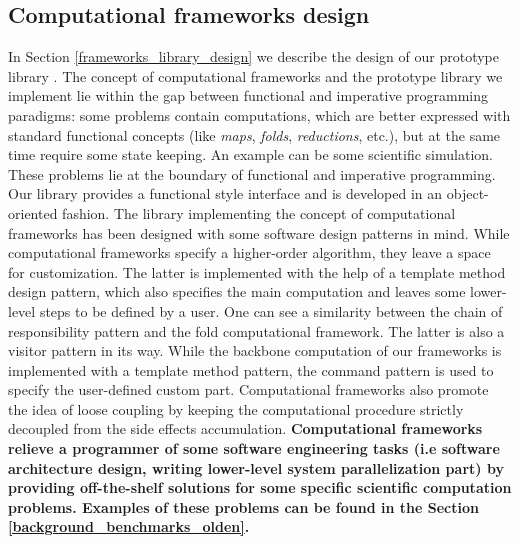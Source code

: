 \subsection{Computational frameworks design}
\label{background_frameworks_design}
\quad In Section \ref{frameworks_library_design} we describe the design of our prototype library \cite{frameworks-repo}. The concept of computational frameworks and the prototype library we implement lie within the gap between functional and imperative programming paradigms: some problems contain computations, which are better expressed with standard functional concepts (like \textit{maps}, \textit{folds}, \textit{reductions}, etc.), but at the same time require some state keeping. An example can be some scientific simulation. These problems lie at the boundary of functional and imperative programming. Our library provides a functional style interface and is developed in an object-oriented fashion.\newline\null
\quad The library implementing the concept of computational frameworks has been designed with some software design patterns in mind. While computational frameworks specify a higher-order algorithm, they leave a space for customization. The latter is implemented with the help of a template method design pattern, which also specifies the main computation and leaves some lower-level steps to be defined by a user. One can see a similarity between the chain of responsibility pattern and the fold computational framework. The latter is also a visitor pattern in its way. While the backbone computation of our frameworks is implemented with a template method pattern, the command pattern is used to specify the user-defined custom part. Computational frameworks also promote the idea of loose coupling by keeping the computational procedure strictly decoupled from the side effects accumulation.\newline\null
\textbf{\quad Computational frameworks relieve a programmer of some software engineering tasks (i.e software architecture design, writing lower-level system parallelization part) by providing off-the-shelf solutions for some specific scientific computation problems. Examples of these problems can be found in the Section \ref{background_benchmarks_olden}.}
